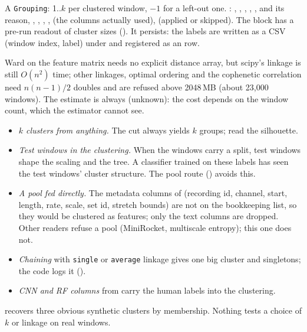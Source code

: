 A \texttt{Grouping}: 1..$k$ per clustered window, $-1$ for a left-out one. :
, , , , ,
 and its reason, , , ,
,  (the columns actually used), 
(applied or skipped). The block has a pre-run readout of cluster sizes (). It
persists: the labels are written as a CSV (window index, label) under
 and registered as an  row.

Ward on the feature matrix needs no explicit distance array, but scipy's linkage is still
$O(n^2)$ time; other linkages, optimal ordering and the cophenetic correlation need $n(n-1)/2$
doubles and are refused above 2048\,MB (about 23,000 windows). The estimate is always
 (unknown): the cost depends on the window count, which the estimator cannot see.

\begin{itemize}
\item \emph{$k$ clusters from anything.} The cut always yields $k$ groups; read the silhouette.
\item \emph{Test windows in the clustering.} When the windows carry a split, test windows shape
  the scaling and the tree. A classifier trained on these labels has seen the test windows'
  cluster structure. The pool route () avoids this.
\item \emph{A pool fed directly.} The  metadata columns of
   (recording id, channel, start, length, rate, scale, set id,
  stretch bounds) are not on the bookkeeping list, so they would be clustered as features; only
  the text columns are dropped. Other readers refuse a pool (MiniRocket, multiscale entropy); this
  one does not.
\item \emph{Chaining} with \texttt{single} or \texttt{average} linkage gives one big cluster and
  singletons; the code logs it ().
\item \emph{CNN and RF columns} from  carry the human labels
  into the clustering.
\end{itemize}

 recovers three obvious synthetic clusters by membership.
Nothing tests a choice of $k$ or linkage on real windows.

